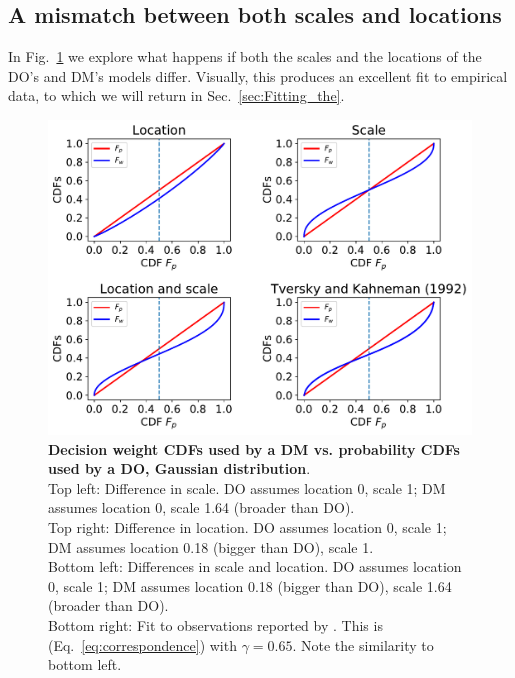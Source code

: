\documentclass[a4paper, 12pt]{article}
\newcommand{\eref}[1]{(Eq.~\ref{eq:#1})}
\newcommand{\flabel}[1]{\label{fig:#1}}
\newcommand{\fref}[1]{Fig.~\ref{fig:#1}}
\newcommand{\seclabel}[1]{\label{sec:#1}}
\newcommand{\secref}[1]{Sec.~\ref{sec:#1}}
\begin{document}
\subsection{A mismatch between both scales and locations\seclabel{A_mismatch}}
In \fref{CDF_weights} we explore what happens if both the scales and the locations of the DO's and DM's models differ. Visually, this produces an excellent fit to empirical data, to which we will return in \secref{Fitting_the}.
 \begin{figure}
 \centering
 \includegraphics[width=1.0\textwidth]{./figs/Gauss_scale_location_both_KT.pdf}
 \caption{{\bf Decision weight CDFs used by a DM vs. probability CDFs used by a DO, Gaussian distribution}.\\ 
 Top left: Difference in scale. DO assumes location 0, scale 1; DM assumes location 0, scale 1.64 (broader than DO).\\ 
 Top right: Difference in location. DO assumes location 0, scale 1; DM assumes location 0.18 (bigger than DO), scale 1.\\
 Bottom left: Differences in scale and location. DO assumes location 0, scale 1; DM assumes location 0.18 (bigger than DO), scale 1.64 (broader than DO).\\ 
 Bottom right: Fit to observations reported by \cite{TverskyKahneman1992}. This is \eref{correspondence} with $\gamma=0.65$.
Note the similarity to bottom left.}
 \flabel{CDF_weights}
 \end{figure}
\end{document}
